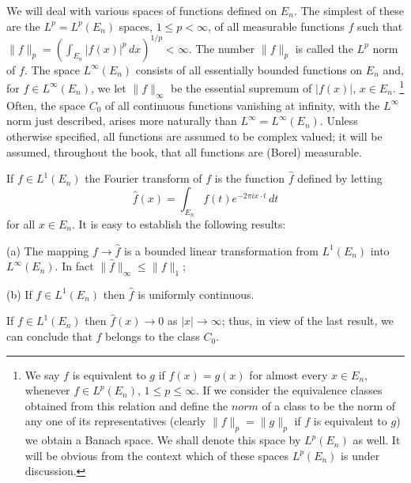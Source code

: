 We will deal with various spaces of functions defined on $E_{n}$. The simplest
of these are the $L^{p} = L^{p}(E_{n})$ spaces, $1 \leq p < \infty$, of all
measurable functions $f$ such that
$\|f\|_{p} = (\int_{E_{n}} |f(x)|^{p} \, dx)^{1/p} < \infty$. The number
$\|f\|_{p}$ is called the $L^{p}$ norm of $f$. The space $L^{\infty}(E_{n})$
consists of all essentially bounded functions on $E_{n}$ and, for
$f \in L^{\infty}(E_{n})$, we let $\|f\|_{\infty}$ be the essential supremum of
$|f(x)|$, $x \in E_{n}$.%
\footnote{We say $f$ is equivalent to $g$ if $f(x) = g(x)$ for almost every
$x \in E_{n}$, whenever $f \in L^{p}(E_{n})$, $1 \leq p \leq \infty$. If we
consider the equivalence classes obtained from this relation and define the
$norm$ of a class to be the norm of any one of its representatives (clearly
$\|f\|_{p} = \|g\|_{p}$ if $f$ is equivalent to $g$) we obtain a Banach space.
We shall denote this space by $L^{p}(E_{n})$ as well. It will be obvious from
the context which of these spaces $L^{p}(E_{n})$ is under discussion.}
Often, the space $C_{0}$ of all continuous functions vanishing at infinity,
with the $L^{\infty}$ norm just described, arises more naturally than
$L^{\infty} = L^{\infty}(E_{n})$. Unless otherwise specified, all functions are
assumed to be complex valued; it will be assumed, throughout the book, that all
functions are (Borel) measurable.

If $f \in L^{1}(E_{n})$ the Fourier transform of $f$ is the function $\hat{f}$
defined by letting
\[
\hat{f}(x)=\int_{E_{n}}f(t)e^{-2\pi i x\cdot t}\,dt
\]
for all $x \in E_{n}$. It is easy to establish the following results:

\begin{theorem}\label{thm:c1-1-1}
\textup{(a)} The mapping $f \to \hat{f}$ is a bounded linear transformation
from $L^{1}(E_{n})$ into $L^{\infty}(E_{n})$. In fact
$\|\hat{f}\|_{\infty} \leq \|f\|_{1}$;

\textup{(b)} If $f \in L^{1}(E_{n})$ then $\hat{f}$ is uniformly continuous.
\end{theorem}

\begin{theorem}\label{thm:c1-1-2}
If $f \in L^{1}(E_{n})$ then $\hat{f}(x) \to 0$ as $|x| \to \infty$; thus, in
view of the last result, we can conclude that $\hat{f}$ belongs to the class
$C_{0}$.
\end{theorem}

